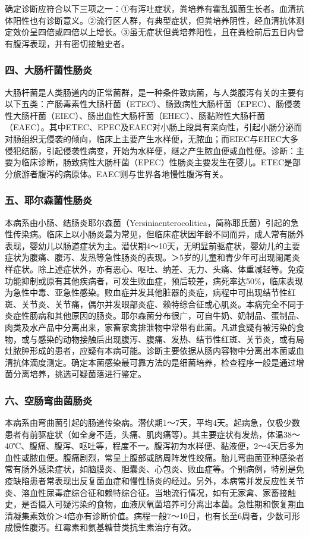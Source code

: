 确定诊断应符合以下三项之一：①有泻吐症状，粪培养有霍乱弧菌生长者。血清抗体阳性也有诊断意义。②流行区人群，有典型症状，但粪培养阴性，经血清抗体测定效价呈四倍或四倍以上增长。③虽无症状但粪培养阳性，且在粪检前后五日内曾有腹泻表现，并有密切接触史者。

\subsubsection{四、大肠杆菌性肠炎}

大肠杆菌是人类肠道内的正常菌群，是一种条件致病菌，与人类腹泻有关的主要有以下五类：产肠毒素性大肠杆菌（ETEC）、肠致病性大肠杆菌（EPEC）、肠侵袭性大肠杆菌（EIEC）、肠出血性大肠杆菌（EHEC）、肠黏附性大肠杆菌（EAEC）。其中ETEC、EPEC及EAEC对小肠上段具有亲向性，引起小肠分泌而对肠组织无侵袭的倾向，临床上主要产生水样便，无脓血；而EIEC与EHEC大多侵犯结肠，引起侵袭性病变，开始为水样便，继之产生脓血便或血性便。诊断：主要为临床诊断，肠致病性大肠杆菌（EPEC）性肠炎主要发生在婴儿。ETEC是部分旅游者腹泻的病原体。EAEC则与世界各地慢性腹泻有关。

\subsubsection{五、耶尔森菌性肠炎}

本病系由小肠、结肠炎耶尔森菌（Yersiniaenterocolitica，简称耶氏菌）引起的急性传染病。临床上以小肠炎最为常见，但临床症状因年龄不同而异，成人常有肠外表现，婴幼儿以肠道症状为主。潜伏期4～10天，无明显前驱症状，婴幼儿的主要症状为腹痛、腹泻、发热等急性肠炎的表现。＞5岁的儿童和青少年可出现阑尾炎样症状。除上述症状外，亦有恶心、呕吐、纳差、无力、头痛、体重减轻等。免疫功能抑制或原有其他疾病者，可发生败血症，预后较差，病死率达50\%，临床表现为急性中毒、亚急性感染。败血症并发其他脏器的炎症，病程中可出现结节性红斑、关节炎、关节痛，偶尔并发眼部炎症、赖特综合征或心肌炎。本病完全不同于炎症性肠病和其他原因的肠炎。耶尔森菌分布很广，可自牛奶、奶制品、蛋制品、肉类及水产品中分离出来，家畜家禽排泄物中常带有此菌。凡进食疑有被污染的食物，或与感染的动物接触后出现腹泻、腹痛、发热、结节性红斑、关节炎，或有局灶脓肿形成的患者，应疑有本病可能。诊断主要依据从肠内容物中分离出本菌或血清抗体滴度测定。确定本菌感染最可靠方法的是细菌培养，检查程序一般是通过增菌分离培养，挑选可疑菌落进行鉴定。

\subsubsection{六、空肠弯曲菌肠炎}

本病系由弯曲菌引起的肠道传染病。潜伏期1～7天，平均4天。起病急，仅极少数患者有前驱症状（如全身不适，头痛、肌肉痛等）。其主要症状有发热，体温38～40℃、腹痛、腹泻、呕吐等，程度不一。腹泻初为水样便、黏液便，2～4天后多为血性或脓血便。腹痛剧烈，常呈上腹部或脐周阵发性绞痛。胎儿弯曲菌亚种感染者常有肠外感染症状，如脑膜炎、胆囊炎、心包炎、败血症等。个别病例，特别是免疫缺陷患者常表现出反复菌血症和慢性肠炎的经过。另外，本病常并发反应性关节炎、溶血性尿毒症综合征和赖特综合征。当地流行情况，如有无家禽、家畜接触史，是否摄入可疑污染的食物，血液厌氧菌培养可分离出本菌。急性期和恢复期血清凝集素效价＞4倍亦有诊断价值。病程一般7～10日，也有长至6周者，少数可形成慢性腹泻。红霉素和氨基糖苷类抗生素治疗有效。

